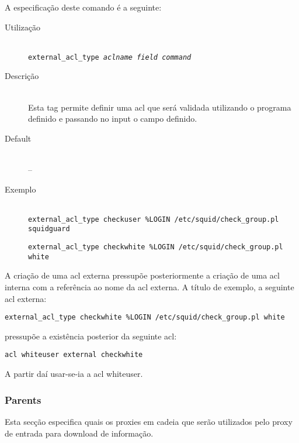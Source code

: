 A especificação deste comando é a seguinte:


\begin{description}
\item[Utilização]~\\
\texttt{external\_acl\_type \emph{aclname} \emph{field}
\emph{command}}

\item[Descrição]~\\
Esta tag permite definir uma acl que será validada utilizando o
programa definido e passando no input o campo definido.

\item[Default]~\\
--

\item[Exemplo]~\\
\texttt{external\_acl\_type checkuser \%LOGIN /etc/squid/check\_group.pl
squidguard}

\texttt{external\_acl\_type checkwhite \%LOGIN /etc/squid/check\_group.pl
white}
\end{description}

A criação de uma acl externa pressupõe posteriormente a
criação de uma acl interna com a referência ao nome da acl
externa.
A título de exemplo, a seguinte acl externa:

\texttt{external\_acl\_type checkwhite \%LOGIN /etc/squid/check\_group.pl
white}

pressupõe a existência posterior da seguinte acl:

\texttt{acl whiteuser external checkwhite}

A partir daí usar-se-ia a acl whiteuser.

\subsubsection{Parents}

Esta secção especifica quais os proxies em cadeia que serão
utilizados pelo proxy de entrada para download de informação.


